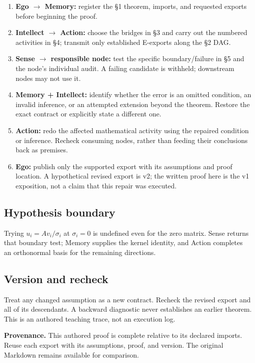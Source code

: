 \documentclass[preprint,12pt,aps,pra,showkeys,amsmath,amssymb,superscriptaddress,floatfix]{revtex4-2}
\theoremstyle{definition}
\theoremstyle{remark}
\providecommand{\tightlist}{\setlength{\itemsep}{2pt}\setlength{\parskip}{0pt}}
\begin{document}
\begin{enumerate}
\def\labelenumi{\arabic{enumi}.}
\tightlist
\item
  \textbf{Ego \(\to\) Memory:} register the §1 theorem, imports, and
  requested exports before beginning the proof.
\item
  \textbf{Intellect \(\to\) Action:} choose the bridges in §3 and carry
  out the numbered activities in §4; transmit only established E-exports
  along the §2 DAG.
\item
  \textbf{Sense \(\to\) responsible node:} test the specific
  boundary/failure in §5 and the node's individual audit. A failing
  candidate is withheld; downstream nodes may not use it.
\item
  \textbf{Memory + Intellect:} identify whether the error is an omitted
  condition, an invalid inference, or an attempted extension beyond the
  theorem. Restore the exact contract or explicitly state a different
  one.
\item
  \textbf{Action:} redo the affected mathematical activity using the
  repaired condition or inference. Recheck consuming nodes, rather than
  feeding their conclusions back as premises.
\item
  \textbf{Ego:} publish only the supported export with its assumptions
  and proof location. A hypothetical revised export is v2; the written
  proof here is the v1 exposition, not a claim that this repair was
  executed.
\end{enumerate}

\subsection{Hypothesis boundary}
Trying \(u_i=Av_i/\sigma _i\) at \(\sigma _i=0\) is undefined even for
the zero matrix. Sense returns that boundary test; Memory supplies the
kernel identity, and Action completes an orthonormal basis for the
remaining directions.

\subsection{Version and recheck}
Treat any changed assumption as a new contract. Recheck the revised
export and all of its descendants. A backward diagnostic never
establishes an earlier theorem. This is an authored teaching trace, not
an execution log.

\par\medskip\begingroup\small\linespread{1.0}\selectfont\noindent\textbf{Provenance.} This authored proof is complete relative to its declared imports. Reuse
each export with its assumptions, proof, and version. The original
Markdown remains available for comparison.
\par\endgroup
\end{document}
